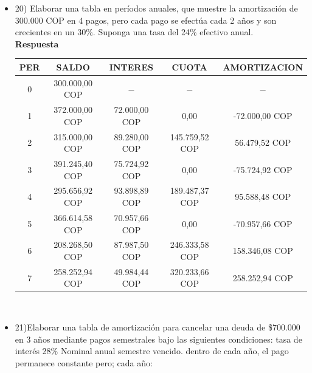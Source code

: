 \begin{itemize}
 \item 20)	 Elaborar una tabla en períodos anuales, que muestre la amortización de 300.000 COP en 4 pagos, pero cada pago se efectúa cada 2 años y son crecientes en un 30\%. Suponga una tasa del 24\% efectivo anual.\\
       \textbf{Respuesta}
       \begin{center}
     \begin{tabular}{| c | c | c | c | c |}
    \hline
    \textbf{PER} & \textbf{SALDO} & \textbf{INTERES} & \textbf{CUOTA} & \textbf{AMORTIZACION}  \\ \hline
    0 & 300.000,00 COP & $-$ & $-$ &  $-$  \\ \hline
    1 & 372.000,00 COP & 72.000,00 COP & 0,00 &  -72.000,00 COP  \\ \hline
    2 & 315.000,00 COP & 89.280,00 COP & 145.759,52 COP &  56.479,52 COP \\ \hline
    3 & 391.245,40 COP & 75.724,92 COP & 0,00 &  -75.724,92 COP  \\ \hline
    4 & 295.656,92 COP & 93.898,89 COP & 189.487,37 COP & 95.588,48 COP  \\ \hline
    5 & 366.614,58 COP & 70.957,66 COP & 0,00 &  -70.957,66 COP  \\ \hline
    6 & 208.268,50 COP & 87.987,50 COP & 246.333,58 COP &  158.346,08 COP  \\ \hline
    7 & 258.252,94 COP & 49.984,44 COP & 320.233,66 COP &  258.252,94 COP \\ \hline
  
    \end{tabular}\\
       \end{center}
       \medskip

 \item 21)Elaborar una tabla de amortización para cancelar una deuda de \$700.000 en 3 años mediante pagos semestrales bajo las siguientes condiciones: tasa de interés 28\% Nominal anual semestre vencido. dentro de cada año, el pago permanece constante pero; cada año:\\


\end{itemize}
